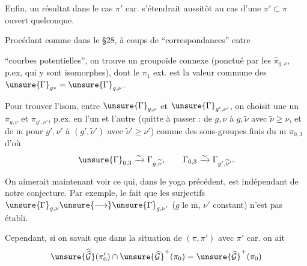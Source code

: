 Enfin, un résultat dans le cas $\pi'$  car. s'étendrait aussitôt au cas d'une $\pi'\subset\pi$ ouvert quelconque.

Procédant  comme dans le \S 28, à coups de ``correspondances''  entre


``courbes potentielles'', on trouve un groupoïde connexe (ponctué par les $\widehat{\pi}_{g,\nu}$, p.ex, \deleted{\unsure{)}} qui y sont  isomorphes), dont le $\pi_1$ ext. est la valeur commune des $\unsure{\Gamma}_{g*}=\unsure{\Gamma}_{g,\nu}$.

Pour trouver  l'isom.  entre $\unsure{\Gamma}_{g,\nu}$ et $\unsure{\Gamma}_{g',\nu'}$, on choisit une   un $\pi_{g,\nu}$ et $\pi_{g',\nu'}$, p.ex. en   l'un et l'autre (quitte à passer : de $g,\nu$ à $g,\widetilde{\nu}$ avec $\widetilde{\nu}\geq\nu$, et de $\overline{\mathrm m}$ pour $g',\nu'$ à $(g',\widetilde{\nu}')$ avec $\widetilde{\nu}'\geq\nu'$) comme des sous-groupes finis du $\overline{\mathrm m}$ $\pi_{0,3}$  d'où
\[
\unsure{\Gamma}_{0,3}\xrightarrow{\sim}\Gamma_{g,\widetilde{\nu}},
\qquad
\Gamma_{0,3}\xrightarrow{\sim}\Gamma_{g',\widetilde{\nu}'}.
\]

On aimerait maintenant voir ce qui, dans le yoga précédent, est indépendant de notre conjecture. Par exemple, le fait que les  surjectifs  $\unsure{\Gamma}_{g,\nu}\unsure{\longrightarrow}\unsure{\Gamma}_{g,\nu'}$ ($g$ le $\overline{\mathrm m}$, $\nu'$ constant) n'est pas établi.

Cependant, si on savait que dans la situation de $(\pi,\pi')$ avec $\pi'$  car. on ait
\[
\unsure{\widehat{\widehat{\mathcal G}}}(\pi'_0)\cap
\unsure{\widehat{\mathcal G}}^{+}(\pi_0)
=
\unsure{\widehat{\mathcal G}}^{+}(\pi_0)
\]


